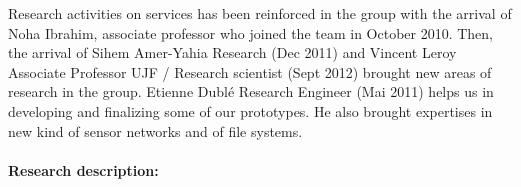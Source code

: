 

Research activities on services has been reinforced in the group with the arrival of Noha Ibrahim, associate professor who joined the team in October 2010. 
Then, the arrival of Sihem Amer-Yahia Research (Dec 2011) and Vincent Leroy Associate Professor UJF / Research scientist (Sept 2012) brought new areas of research in the group. 
Etienne Dubl{\'e} Research Engineer (Mai 2011) helps us in developing and finalizing some of our prototypes. He also brought expertises in new kind of sensor networks and of file systems. 


\paragraph{Research description:}

